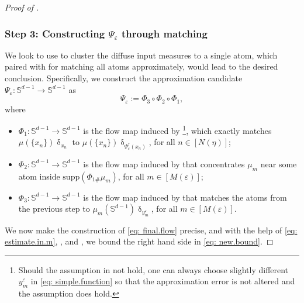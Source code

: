 \documentclass[a4paper,11pt]{article}
\theoremstyle{plain}
\newcommand{\supp}{\mathrm{supp}}
\renewcommand{\S}{\mathbb{S}^{d-1}}
\renewcommand{\leq}{\leqslant}
\numberwithin{equation}{section}
\begin{document}
\begin{proof}[Proof of ]
\subsubsection*{Step 3: Constructing $\Psi_\varepsilon$ through matching}
We look to use  to cluster the diffuse input measures to a single atom, which paired with  for matching all atoms approximately, would lead to the desired conclusion. 
Specifically, we construct the approximation candidate $\Psi_\varepsilon:\S\to\S$ as
\begin{equation}\label{eq: final.flow}
    \Psi_\varepsilon:=\Phi_3\circ \Phi_2\circ \Phi_1,
\end{equation}
where
\begin{itemize}
    \item $\Phi_1:\S\to \S$ is the flow map induced by \footnote{Should the assumption in  not hold, one can always choose slightly different \(y_m^\varepsilon\) in \eqref{eq: simple.function} so that the approximation error is not altered and the assumption does hold.}, which exactly matches $\mu(\{x_n\})\updelta_{x_n}$ to $\mu(\{x_n\})\updelta_{\Psi^\dagger_\varepsilon(x_n)}$, for all $n\in[N(\eta)]$;
    \item $\Phi_2:\S\to \S$ is the flow map induced by  that concentrates $\mu_m$ near some atom inside $\supp(\Phi_{1\#}\mu_m)$, for all $m\in[M(\varepsilon)]$;
    \item $\Phi_3:\S\to \S$ is the flow map induced by  that matches the atoms from the previous step to $\mu_m(\S)\updelta_{y_m^\varepsilon}$, for all $m\in[M(\varepsilon)]$.
\end{itemize}
We now make the construction of \eqref{eq: final.flow} precise, and with the help of \eqref{eq: estimate.in.m}, , and , we bound the right hand side in \eqref{eq: new.bound}.

\end{proof}
\end{document}
